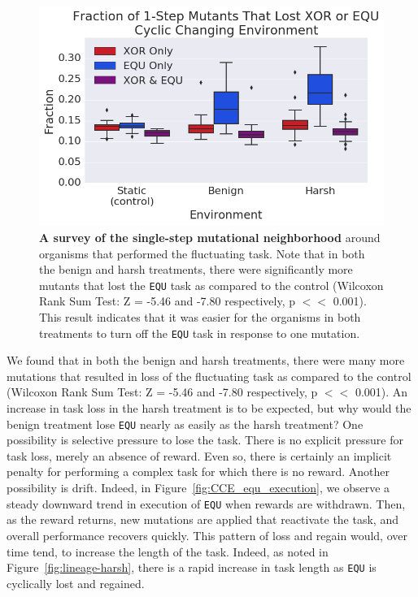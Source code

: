 \documentclass[10pt,letterpaper]{article}
\begin{document}
	\begin{figure}[!h] %
	\includegraphics[trim={0.2cm 0 0 0.2cm},clip,width=0.75\columnwidth]{figures/CE/CCE_frac_1step__box.png}
	\caption{\textbf{A survey of the single-step mutational neighborhood} around organisms that performed the fluctuating task. Note that in both the benign and harsh treatments, there were significantly more mutants that lost the \texttt{EQU} task as compared to the control (Wilcoxon Rank Sum Test: Z = -5.46 and -7.80 respectively, p $<<$ 0.001). This result indicates that it was easier for the organisms in both treatments to turn off the \texttt{EQU} task in response to one mutation. 
	}\label{fig:CCE_single_step}
	\end{figure}


We found that in both the benign and harsh treatments, there were many more mutations that resulted in loss of the fluctuating task as compared to the control (Wilcoxon Rank Sum Test: Z = -5.46 and -7.80 respectively, p $<<$ 0.001). An increase in task loss in the harsh treatment is to be expected, but why would the benign treatment lose \texttt{EQU} nearly as easily as the harsh treatment? One possibility is selective pressure to lose the task. There is no explicit pressure for task loss, merely an absence of reward. Even so, there is certainly an implicit penalty for performing a complex task for which there is no reward. Another possibility is drift. Indeed, in Figure~\ref{fig:CCE_equ_execution}, we observe a steady downward trend in execution of \texttt{EQU} when rewards are withdrawn. Then, as the reward returns, new mutations are applied that reactivate the task, and overall performance recovers quickly. This pattern of loss and regain would, over time tend, to increase the length of the task. Indeed, as noted in Figure~\ref{fig:lineage-harsh}, there is a rapid increase in task length as \texttt{EQU} is cyclically lost and regained. 
\end{document}
